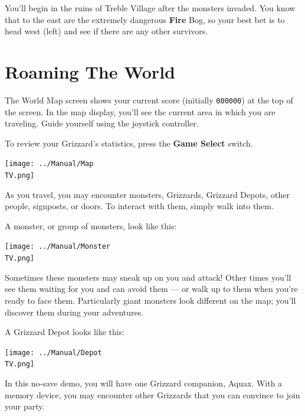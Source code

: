 \documentclass[10pt,twocolumn,openany,article]{memoir}
\newcommand\TV{NTSC}
\newcommand\TV{PAL}
\newcommand\TV{SECAM}
\begin{document}
\fi

You'll begin in the ruins of  Treble Village after the monsters invaded.
You know that to the east are  the extremely dangerous \textbf{Fire} Bog, so your
best  bet   is  to  head   west  (left)  and   see  if  there   are  any
other survivors.

\section{Roaming The World}

The   World   Map   screen   shows   your   current   score   (initially
\texttt{000000}) at  the top of the  screen. In the map  display, you'll
see the  current area in which  you are traveling. Guide  yourself using
the joystick controller.

To   review  your   Grizzard's   statistics,   press  the   \textbf{Game
  Select} switch.

\begin{center}
  \texttt{[image: ../Manual/Map\\TV.png]}
\end{center}

As  you   travel,  you  may   encounter  monsters,\ifdefined\NOSAVE\else
Grizzards,  \fi  Grizzard Depots,  other  people,  signposts, or  doors.
To interact with them, simply walk into them.

A monster, or group of monsters, look like this:

\begin{center}
  \texttt{[image: ../Manual/Monster\\TV.png]}
\end{center}

Sometimes these  monsters may sneak  up on  you and attack!  Other times
you'll see  them waiting for you  and can avoid  them --- or walk  up to
them when  you're ready to  face them. Particularly giant  monsters look
different on the map; you'll discover them during your adventures.

A Grizzard Depot looks like this:

\begin{center}
  \texttt{[image: ../Manual/Depot\\TV.png]}
\end{center}

\ifdefined\NOSAVE

In  this no-save  demo, you  will  have one  Grizzard companion,  Aquax.
With a  memory device, you  may encounter  other Grizzards that  you can
convince to join your party.
\end{document}
